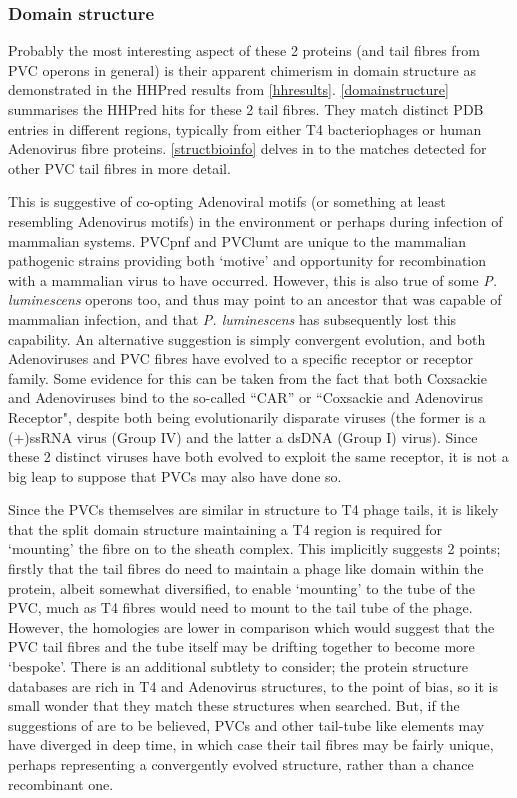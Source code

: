 \subsubsection{Domain structure}\label{domainstructuresection}
Probably the most interesting aspect of these 2 proteins (and tail fibres from PVC operons in general) is their apparent chimerism in domain structure as demonstrated in the HHPred results from \vref{hhresults}. \vref{domainstructure} summarises the HHPred hits for these 2 tail fibres. They match distinct PDB entries in different regions, typically from either T4 bacteriophages or human Adenovirus fibre proteins. \vref{structbioinfo} delves in to the matches detected for other PVC tail fibres in more detail.

This is suggestive of \Pa{} co-opting Adenoviral motifs (or something at least resembling Adenovirus motifs) in the environment or perhaps during infection of mammalian systems. PVCpnf and PVClumt are unique to the mammalian pathogenic strains providing both `motive' and opportunity for recombination with a mammalian virus to have occurred. However, this is also true of some \emph{P. luminescens} operons too, and thus may point to an ancestor that was capable of mammalian infection, and that \emph{P. luminescens} has subsequently lost this capability. An alternative suggestion is simply convergent evolution, and both Adenoviruses and PVC fibres have evolved to a specific receptor or receptor family. Some evidence for this can be taken from the fact that both Coxsackie and Adenoviruses bind to the so-called ``CAR'' or ``Coxsackie and Adenovirus Receptor", despite both being evolutionarily disparate viruses (the former is a (+)ssRNA virus (Group IV) and the latter a dsDNA (Group I) virus). Since these 2 distinct viruses have both evolved to exploit the same receptor, it is not a big leap to suppose that PVCs may also have done so.

Since the PVCs themselves are similar in structure to T4 phage tails, it is likely that the split domain structure maintaining a T4 region is required for `mounting' the fibre on to the sheath complex. This implicitly suggests 2 points; firstly that the tail fibres do need to maintain a phage like domain within the protein, albeit somewhat diversified, to enable `mounting' to the tube of the PVC, much as T4 fibres would need to mount to the tail tube of the phage. However, the homologies are lower in comparison which would suggest that the PVC tail fibres and the tube itself may be drifting together to become more `bespoke'. There is an additional subtlety to consider; the protein structure databases are rich in T4 and Adenovirus structures, to the point of bias, so it is small wonder that they match these structures when searched. But, if the suggestions of \cite{Sarris2014} are to be believed, PVCs and other tail-tube like elements may have diverged in deep time, in which case their tail fibres may be fairly unique, perhaps representing a convergently evolved structure, rather than a chance recombinant one.


